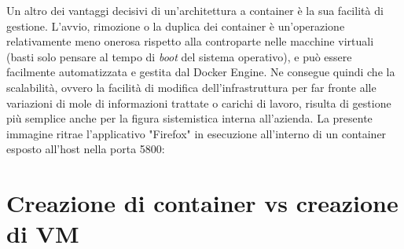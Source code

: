 Un altro dei vantaggi decisivi di un'architettura a container è la sua facilità di gestione. L'avvio, rimozione o la duplica dei container è un'operazione relativamente meno onerosa rispetto alla controparte nelle macchine virtuali (basti solo pensare al tempo di \textit{\gls{boot}} del sistema operativo), e può essere facilmente automatizzata e gestita dal Docker Engine. Ne consegue quindi che la scalabilità, ovvero la facilità di modifica dell'infrastruttura per far fronte alle variazioni di mole di informazioni trattate o carichi di lavoro, risulta di gestione più semplice anche per la figura sistemistica interna all'azienda.
La presente immagine ritrae l'applicativo "Firefox" in esecuzione all'interno di un container esposto all'host nella porta 5800:
\section{Creazione di container vs creazione di VM}

